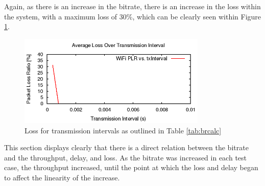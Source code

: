 Again, as there is an increase in the bitrate, there is an increase in the loss
within the system, with a maximum loss of 30\%, which can be clearly seen within
Figure \ref{fig:QAP2Loss}.

\begin{figure}[H]
	\centering
	\includegraphics[width=0.8\textwidth]{images/EE500/QA/P2/Images/wifi-loss}
	\caption{Loss for transmission intervals as outlined in Table
	\ref{tab:brcalc}}
	\label{fig:QAP2Loss}
\end{figure}

This section displays clearly that there is a direct relation between the
bitrate and the throughput, delay, and loss. As the bitrate was increased in
each test case, the throughput increased, until the point at which the loss and
delay began to affect the linearity of the increase.
